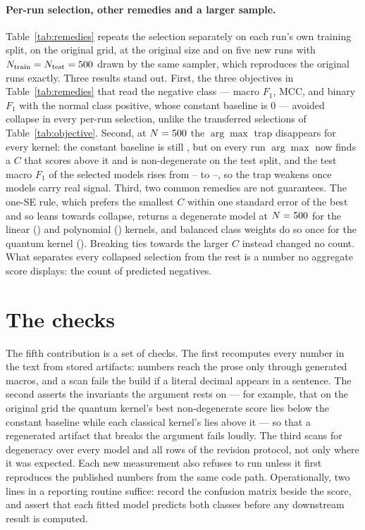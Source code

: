\documentclass[runningheads]{llncs}
\newcommand{\Fone}{F_1}
\begin{document}


\paragraph{Per-run selection, other remedies and a larger sample.}
Table~\ref{tab:remedies} repeats the selection separately on each run's own
training split, on the original grid, at the original size and on five new
runs with $N_{\text{train}} = N_{\text{test}} = 500$ drawn by the same
sampler, which reproduces the original runs exactly. Three results stand out.
First, the three objectives in Table~\ref{tab:remedies} that read the
negative class --- macro $\Fone$, MCC, and binary $\Fone$ with the normal
class positive, whose constant baseline is $0$ --- avoided collapse in every
per-run selection, unlike the transferred selections of
Table~\ref{tab:objective}. Second, at $N = 500$ the
$\arg\max$ trap disappears for every kernel: the constant baseline is still
\pnFiveBaseline, but on every run $\arg\max$ now finds a $C$ that scores
above it and is non-degenerate on the test split, and the test macro $\Fone$ of
the selected models rises from \pmacroHundredLo--\pmacroHundredHi{} to
\pmacroFiveLo--\pmacroFiveHi, so the trap weakens once models carry real
signal. Third, two common remedies are not guarantees. The one-SE rule, which
prefers the smallest $C$ within one standard error of the best and so leans
towards collapse, returns a degenerate model at $N = 500$ for the linear
(\pprOneSeLinFive) and polynomial (\pprOneSePolyFive) kernels, and balanced
class weights do so once for the quantum kernel (\pprBalQFive). Breaking ties
towards the larger $C$ instead changed no count. What separates every
collapsed selection from the rest is a number no aggregate score displays:
the count of predicted negatives.

\section{The checks}\label{sec:checks}

The fifth contribution is a set of checks. The first recomputes every number in the text from stored
artifacts: numbers reach the prose only through generated macros, and a scan
fails the build if a literal decimal appears in a sentence. The second asserts
the invariants the argument rests on --- for example, that on the original
grid the quantum kernel's best non-degenerate score lies below the constant
baseline while each classical kernel's lies above it --- so that a regenerated
artifact that breaks the argument fails loudly. The third scans for degeneracy
over every model and all \prevRowsScanned{} rows of the revision protocol, not
only where it was expected. Each new measurement also refuses to run unless it
first reproduces the published numbers from the same code path.
Operationally, two lines in a reporting routine suffice: record the confusion
matrix beside the score, and assert that each fitted model predicts both
classes before any downstream result is computed.
\end{document}
